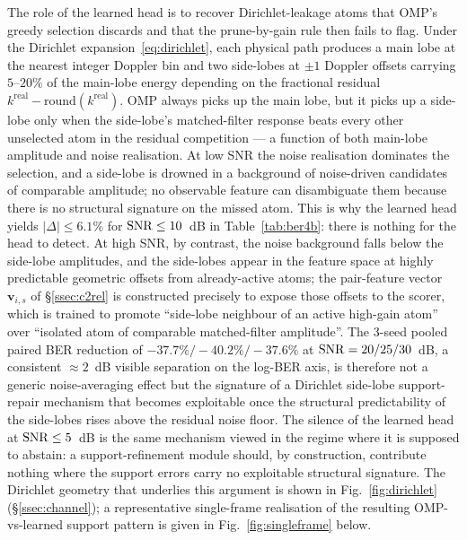 The role of the learned head is to recover Dirichlet-leakage atoms that OMP's greedy selection discards and that the prune-by-gain rule then fails to flag. Under the Dirichlet expansion~\eqref{eq:dirichlet}, each physical path produces a main lobe at the nearest integer Doppler bin and two side-lobes at $\pm 1$ Doppler offsets carrying $5$--$20\%$ of the main-lobe energy depending on the fractional residual $k^\text{real} - \mathrm{round}(k^\text{real})$. OMP always picks up the main lobe, but it picks up a side-lobe only when the side-lobe's matched-filter response beats every other unselected atom in the residual competition --- a function of both main-lobe amplitude and noise realisation. At low SNR the noise realisation dominates the selection, and a side-lobe is drowned in a background of noise-driven candidates of comparable amplitude; no observable feature can disambiguate them because there is no structural signature on the missed atom. This is why the learned head yields $|\Delta| \leq 6.1\%$ for $\mathrm{SNR} \leq 10$~dB in Table~\ref{tab:ber4b}: there is nothing for the head to detect. At high SNR, by contrast, the noise background falls below the side-lobe amplitudes, and the side-lobes appear in the feature space at highly predictable geometric offsets from already-active atoms; the pair-feature vector $\mathbf{v}_{i,s}$ of \S\ref{ssec:c2rel} is constructed precisely to expose those offsets to the scorer, which is trained to promote ``side-lobe neighbour of an active high-gain atom'' over ``isolated atom of comparable matched-filter amplitude''. The 3-seed pooled paired BER reduction of $-37.7\%/-40.2\%/-37.6\%$ at $\mathrm{SNR} = 20/25/30$~dB, a consistent $\approx 2$~dB visible separation on the log-BER axis, is therefore not a generic noise-averaging effect but the signature of a Dirichlet side-lobe support-repair mechanism that becomes exploitable once the structural predictability of the side-lobes rises above the residual noise floor. The silence of the learned head at $\mathrm{SNR} \leq 5$~dB is the same mechanism viewed in the regime where it is supposed to abstain: a support-refinement module should, by construction, contribute nothing where the support errors carry no exploitable structural signature. The Dirichlet geometry that underlies this argument is shown in Fig.~\ref{fig:dirichlet} (\S\ref{ssec:channel}); a representative single-frame realisation of the resulting OMP-vs-learned support pattern is given in Fig.~\ref{fig:singleframe} below.

